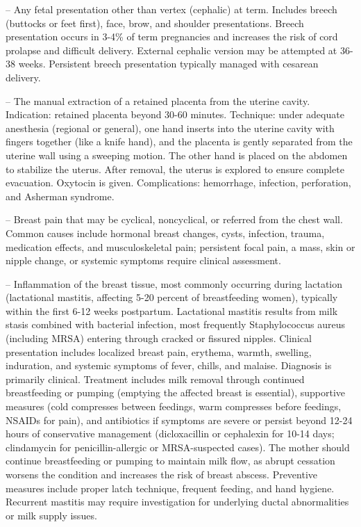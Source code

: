-- Any fetal presentation other than vertex (cephalic) at term. Includes breech (buttocks or feet first), face, brow, and shoulder presentations. Breech presentation occurs in 3-4\% of term pregnancies and increases the risk of cord prolapse and difficult delivery. External cephalic version may be attempted at 36-38 weeks. Persistent breech presentation typically managed with cesarean delivery.

-- The manual extraction of a retained placenta from the uterine cavity. Indication: retained placenta beyond 30-60 minutes. Technique: under adequate anesthesia (regional or general), one hand inserts into the uterine cavity with fingers together (like a knife hand), and the placenta is gently separated from the uterine wall using a sweeping motion. The other hand is placed on the abdomen to stabilize the uterus. After removal, the uterus is explored to ensure complete evacuation. Oxytocin is given. Complications: hemorrhage, infection, perforation, and Asherman syndrome.


-- Breast pain that may be cyclical, noncyclical, or referred from the chest wall. Common causes include hormonal breast changes, cysts, infection, trauma, medication effects, and musculoskeletal pain; persistent focal pain, a mass, skin or nipple change, or systemic symptoms require clinical assessment.

-- Inflammation of the breast tissue, most commonly occurring during lactation (lactational mastitis, affecting 5-20 percent of breastfeeding women), typically within the first 6-12 weeks postpartum. Lactational mastitis results from milk stasis combined with bacterial infection, most frequently Staphylococcus aureus (including MRSA) entering through cracked or fissured nipples. Clinical presentation includes localized breast pain, erythema, warmth, swelling, induration, and systemic symptoms of fever, chills, and malaise. Diagnosis is primarily clinical. Treatment includes milk removal through continued breastfeeding or pumping (emptying the affected breast is essential), supportive measures (cold compresses between feedings, warm compresses before feedings, NSAIDs for pain), and antibiotics if symptoms are severe or persist beyond 12-24 hours of conservative management (dicloxacillin or cephalexin for 10-14 days; clindamycin for penicillin-allergic or MRSA-suspected cases). The mother should continue breastfeeding or pumping to maintain milk flow, as abrupt cessation worsens the condition and increases the risk of breast abscess. Preventive measures include proper latch technique, frequent feeding, and hand hygiene. Recurrent mastitis may require investigation for underlying ductal abnormalities or milk supply issues.

